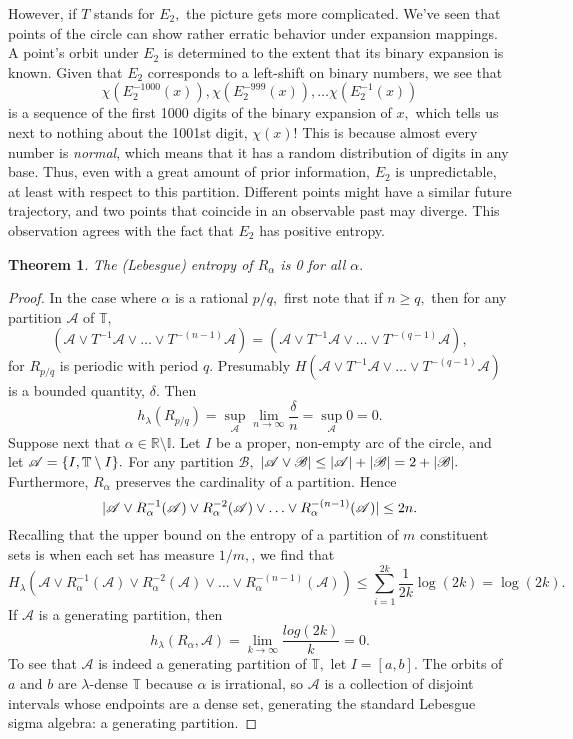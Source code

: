 \documentclass[12pt, letterpaper, oneside]{book}
\newcommand{\ga}{\ensuremath{\alpha}}
\newcommand{\gd}{\ensuremath{\delta}}
\newcommand{\gl}{\ensuremath{\lambda}}
\newcommand{\R}{\mathbb{R}}
\newcommand{\T}{\mathbb{T}}
\DeclarePairedDelimiter{\abs}{\lvert}{\rvert}
\DeclarePairedDelimiter{\set}{\lbrace}{\rbrace}
\theoremstyle{plain}
\newtheorem{theorem}{Theorem}
\theoremstyle{definition}
\theoremstyle{remark}
\begin{document}
However, if $T$ stands for $E_2,$ the picture gets more complicated. We've seen that points of the circle can show rather erratic behavior under expansion mappings. A point's orbit under $E_2$ is determined to the extent that its binary expansion is known. Given that $E_2$ corresponds to a left-shift on binary numbers, we see that 
\[
\chi(E_2^{-1000}(x)), \chi(E_2^{-999}(x)), \ldots \chi(E_2^{-1}(x))
\]
is a sequence of the first 1000 digits of the binary expansion of $x,$ which tells us next to nothing about the 1001st digit, $\chi(x)$! This is because almost every number is \textit{normal}, which means that it has a random distribution of digits in any base. Thus, even with a great amount of prior information, $E_2$ is unpredictable, at least with respect to this partition. Different points might have a similar future trajectory, and two points that coincide in an observable past may diverge. This observation agrees with the fact that $E_2$ has positive entropy. 

\begin{theorem}
The (Lebesgue) entropy of $R_\ga$ is 0 for all $\ga.$ 
\end{theorem}
\begin{proof}
In the case where $\ga$ is a rational $p/q,$ first note that if $n \geq q,$ then for any partition $\mathscr{A}$ of $\T,$
\[
(\mathscr{A} \lor T^{-1}\mathscr{A} \lor \ldots \lor T^{-(n-1)}\mathscr{A}) = (\mathscr{A} \lor T^{-1}\mathscr{A} \lor \ldots \lor T^{-(q-1)}\mathscr{A}),
\]
for $R_{p/q}$ is periodic with period $q.$ Presumably $H(\mathscr{A} \lor T^{-1}\mathscr{A} \lor \ldots \lor T^{-(q-1)}\mathscr{A})$ is a bounded quantity, $\gd.$ Then
\[
h_\gl(R_{p/q}) = \sup_\mathscr{A} \lim _{n \to \infty} \frac{\gd}{n} = \sup_\mathscr{A} 0 = 0. 
\]
Suppose next that $\ga \in \R \setminus \mathbb{I} .$ Let $I$ be a proper, non-empty arc of the circle, and let $\mathscr{A} = \set{I, \T \setminus I}.$ For any partition $\mathscr{B},$ $\abs{\mathscr{A} \lor \mathscr{B}} \leq \abs{\mathscr{A}} + \abs{\mathscr{B}} = 2 + \abs{\mathscr{B}}.$ Furthermore, $R_\ga$ preserves the cardinality of a partition. Hence 
\[
\abs{\mathscr{A} \lor R_\ga^{-1}(\mathscr{A}) \lor R_\ga^{-2}(\mathscr{A}) \lor \ldots \lor R_\ga^{-(n-1)}(\mathscr{A})} \leq 2n.
\]
Recalling that the upper bound on the entropy of a partition of $m$ constituent sets is when each set has measure $1/m,$, we find that
\[
H_{\gl}(\mathscr{A} \lor R_\ga^{-1}(\mathscr{A}) \lor R_\ga^{-2}(\mathscr{A}) \lor \ldots \lor R_\ga^{-(n-1)}(\mathscr{A})) \leq \sum_{i = 1}^{2k}\frac{1}{2k}\log (2k) = \log (2k).
\]
If $\mathscr{A}$ is a generating partition, then
\[
h_{\gl}(R_\ga, \mathscr{A}) = \lim_{k \to \infty}\frac{log(2k)}{k} = 0. 
\] 
To see that $\mathscr{A}$ is indeed a generating partition of $\T,$ let $I = [a,b].$ The orbits of $a$ and $b$ are $\gl$-dense $\T$ because $\ga$ is irrational, so $\mathscr{A}$ is a collection of disjoint intervals whose endpoints are a dense set, generating the standard Lebesgue sigma algebra: a generating partition. 
\end{proof}
\end{document}
